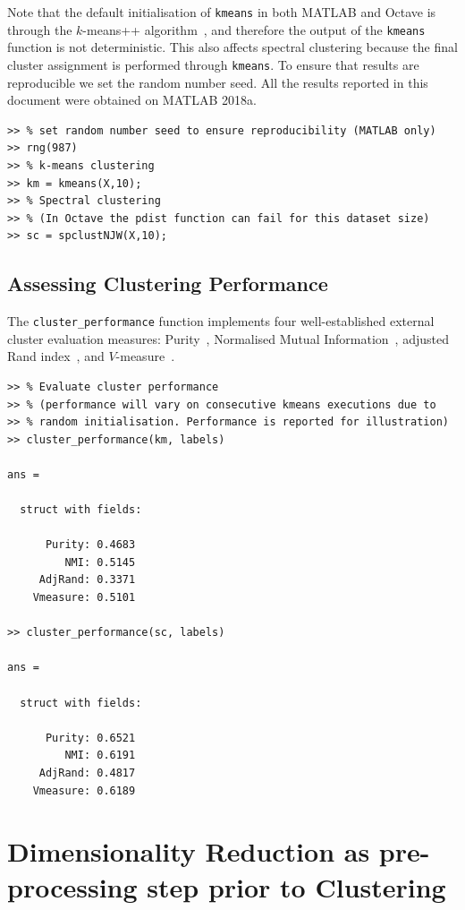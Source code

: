 \documentclass{book}
\begin{document}
Note that the default initialisation of {\tt kmeans} in both MATLAB and 
Octave is through the $k$-means++ algorithm~\cite{ArthurV2007}, and therefore
the output of the {\tt kmeans} function is not deterministic. This also affects
spectral clustering because the final cluster assignment is performed through
{\tt kmeans}. To ensure that results are reproducible we set the random number
seed.
%
All the results reported in this document were obtained on MATLAB 2018a.


\begin{lstlisting}
>> % set random number seed to ensure reproducibility (MATLAB only)
>> rng(987)
>> % k-means clustering
>> km = kmeans(X,10);
>> % Spectral clustering
>> % (In Octave the pdist function can fail for this dataset size)
>> sc = spclustNJW(X,10);
\end{lstlisting}

\subsection{Assessing Clustering Performance}

The {\tt cluster\_performance} function implements four well-established
external cluster evaluation measures: Purity~\cite{ZhaoK2004}, Normalised
Mutual Information~\cite{StrehlG2002}, adjusted Rand
index~\cite{Hubert1985}, and $V$-measure~\cite{Rosenberg2007}.



\begin{lstlisting}
>> % Evaluate cluster performance
>> % (performance will vary on consecutive kmeans executions due to
>> % random initialisation. Performance is reported for illustration) 
>> cluster_performance(km, labels)

ans = 

  struct with fields:

      Purity: 0.4683
         NMI: 0.5145
     AdjRand: 0.3371
    Vmeasure: 0.5101

>> cluster_performance(sc, labels)

ans = 

  struct with fields:

      Purity: 0.6521
         NMI: 0.6191
     AdjRand: 0.4817
    Vmeasure: 0.6189

\end{lstlisting}



\section{Dimensionality Reduction as pre-processing step prior to Clustering}
\end{document}
